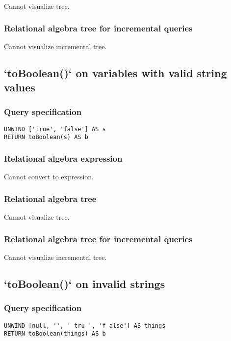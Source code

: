Cannot visualize tree.

\subsubsection*{Relational algebra tree for incremental queries}

Cannot visualize incremental tree.

\subsection{`toBoolean()` on variables with valid string values}

\subsubsection*{Query specification}

\begin{lstlisting}
UNWIND ['true', 'false'] AS s
RETURN toBoolean(s) AS b
\end{lstlisting}

\subsubsection*{Relational algebra expression}

Cannot convert to expression.

\subsubsection*{Relational algebra tree}

Cannot visualize tree.

\subsubsection*{Relational algebra tree for incremental queries}

Cannot visualize incremental tree.

\subsection{`toBoolean()` on invalid strings}

\subsubsection*{Query specification}

\begin{lstlisting}
UNWIND [null, '', ' tru ', 'f alse'] AS things
RETURN toBoolean(things) AS b
\end{lstlisting}

